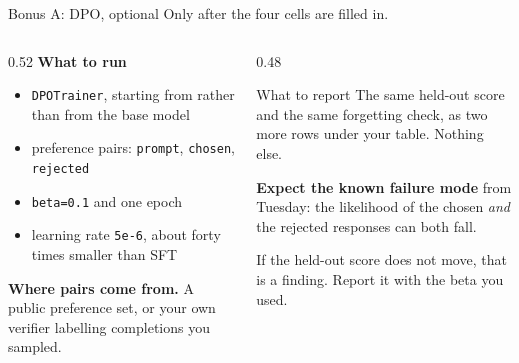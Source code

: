 \documentclass[aspectratio=169,10pt]{beamer}
\begin{document}
\iffalse
\begin{frame}{Bonus A: DPO, optional}
  \alert{Only after the four cells are filled in.}
  \begin{columns}[T]
    \begin{column}{0.52\textwidth}
      \textbf{What to run}
      \begin{itemize}\small
        \item \texttt{DPOTrainer}, starting from  rather
          than from the base model
        \item preference pairs: \texttt{prompt}, \texttt{chosen},
          \texttt{rejected}
        \item \texttt{beta=0.1} and one epoch
        \item learning rate \texttt{5e-6}, about forty times smaller than SFT
      \end{itemize}
      \vspace{0.3em}
      \textbf{Where pairs come from.} A public preference set, or your own
      verifier labelling completions you sampled.
    \end{column}
    \begin{column}{0.48\textwidth}
      \begin{block}{What to report}
        \small
        The same held-out score and the same forgetting check, as two more rows
        under your table. Nothing else.
      \end{block}
      \vspace{0.3em}
      \small
      \textbf{Expect the known failure mode} from Tuesday: the likelihood of
      the chosen \emph{and} the rejected responses can both fall.
      \vspace{0.3em}

      If the held-out score does not move, that is a finding. Report it with
      the beta you used.
    \end{column}
  \end{columns}
\end{frame}
\end{document}
